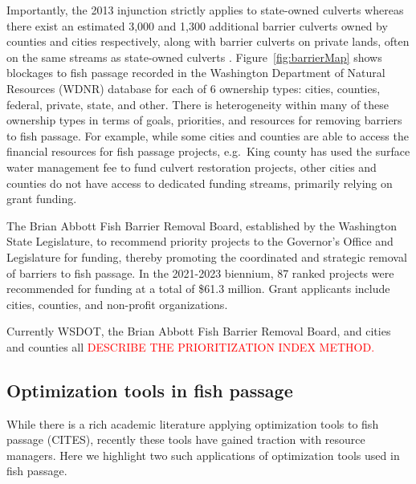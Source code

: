 \documentclass[12pt]{elsarticle}
\begin{document}
Importantly, the 2013 injunction strictly applies to state-owned culverts whereas there exist an estimated 3,000 and 1,300 additional barrier culverts owned by counties and cities respectively, along with barrier culverts on private lands, often on the same streams as state-owned culverts \citep{brown2019coming}. Figure~\ref{fig:barrierMap} shows blockages to fish passage recorded in the Washington Department of Natural Resources (WDNR) database for each of 6 ownership types: cities, counties, federal, private, state, and other. There is heterogeneity within many of these ownership types in terms of goals, priorities, and resources for removing barriers to fish passage. For example, while some cities and counties are able to access the financial resources for fish passage projects, e.g.\ King county has used the surface water management fee to fund culvert restoration projects, other cities and counties do not have access to dedicated funding streams, primarily relying on grant funding.  

The Brian Abbott Fish Barrier Removal Board, established by the Washington State Legislature, to recommend priority projects to the Governor's Office and Legislature for funding, thereby promoting the coordinated and strategic removal of barriers to fish passage. In the 2021-2023 biennium, 87 ranked projects were recommended for funding at a total of \$61.3 million. Grant applicants include cities, counties, and non-profit organizations.

Currently WSDOT, the Brian Abbott Fish Barrier Removal Board, and cities and counties all \textcolor{red}{DESCRIBE THE PRIORITIZATION INDEX METHOD.}


\subsection{Optimization tools in fish passage}

While there is a rich academic literature applying optimization tools to fish passage (CITES), recently these tools have gained traction with resource managers. Here we highlight two such applications of optimization tools used in fish passage. 
\end{document}
